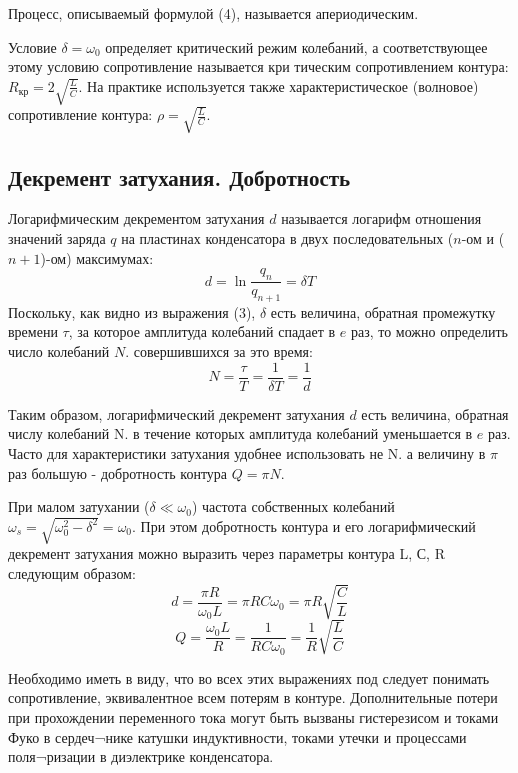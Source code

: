 Процесс, описываемый формулой (4), называется апериодическим.


Условие $\delta=\omega_0$ определяет критический режим колебаний, а соответствующее этому условию сопротивление называется кри 
тическим сопротивлением контура: $R_{\text{кр}}=2\sqrt{\frac{L}{C}}$. На практике используется также характеристическое (волновое) сопротивление 
контура: $\rho=\sqrt{\frac{L}{C}}$.

\subsection{Декремент затухания. Добротность}
Логарифмическим декрементом затухания $d$ называется логарифм отношения значений заряда $q$ на пластинах конденсатора в двух последовательных ($n$-ом и ($n+1$)-ом) максимумах:
\begin{equation}
	d=\ln{\frac{q_n}{q_{n+1}}}=\delta T
\end{equation}
Поскольку, как видно из выражения (3), $\delta$ есть величина, обратная промежутку времени $\tau$, за которое амплитуда колебаний спадает в $e$ раз, то можно определить число колебаний $N$. совершившихся за это время:
\begin{equation}
	N=\frac{\tau}{T}=
		\frac{1}{\delta T}=
			\frac{1}{d}
\end{equation}

Таким образом, логарифмический декремент затухания $d$ есть величина, обратная числу колебаний N. в течение которых амплитуда колебаний уменьшается в $e$ раз.
Часто для характеристики затухания удобнее использовать не N. а величину в $\pi$ раз большую - добротность контура $Q=\pi N$.
 
При малом затухании ($\delta \ll \omega_0$) частота собственных колебаний 
$\omega_s=\sqrt{\omega_0^2 - \delta^2}=\omega_0$. 
При этом добротность контура и его
логарифмический декремент затухания можно выразить через параметры контура L, С, R следующим образом:
\begin{equation}
	d=\frac{\pi R}{\omega_0 L}=\pi RC\omega_0=\pi R\sqrt{\frac{C}{L}}
\end{equation}
\begin{equation}
	Q=\frac{\omega_0 L}{R}=\frac{1}{RC\omega_0}=\frac{1}{R}\sqrt{\frac{L}{C}}
\end{equation}

Необходимо иметь в виду, что во всех этих выражениях под следует понимать сопротивление, эквивалентное всем потерям в контуре. Дополнительные потери при прохождении переменного тока могут быть вызваны гистерезисом и токами Фуко в сердеч¬нике катушки индуктивности, токами утечки и процессами поля¬ризации в диэлектрике конденсатора.
